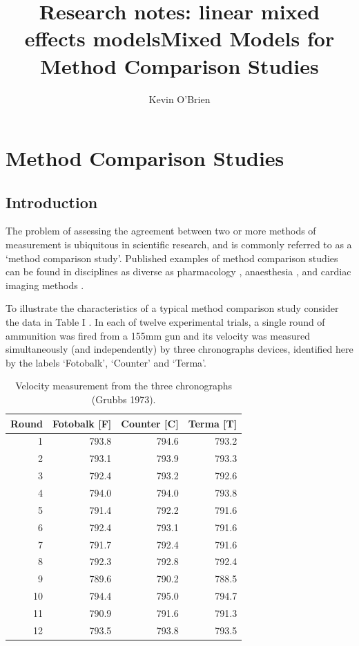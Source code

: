 \documentclass[12pt, a4paper]{report}
\title{Research notes: linear mixed effects models}
\author{ } \date{ }
\theoremstyle{plain}
\theoremstyle{definition}
\theoremstyle{remark}
\begin{document}
\author{Kevin O'Brien}
\title{Mixed Models for Method Comparison Studies}

\newpage
\chapter{Method Comparison Studies}

\section{Introduction}
The problem of assessing the agreement between two or more methods
of measurement is ubiquitous in scientific research, and is
commonly referred to as a `method comparison study'. Published
examples of method comparison studies can be found in disciplines
as diverse as pharmacology \citep{ludbrook97}, anaesthesia
\citep{Myles}, and cardiac imaging methods \citep{Krumm}.
\smallskip

To illustrate the characteristics of a typical method comparison
study consider the data in Table I \citep{Grubbs73}. In each of
twelve experimental trials, a single round of ammunition was fired
from a 155mm gun and its velocity was measured simultaneously (and
independently) by three chronographs devices, identified here by
the labels `Fotobalk', `Counter' and `Terma'.
\smallskip


\newpage

\begin{table}[ht]
\begin{center}
\begin{tabular}{rrrr}
  \hline
  Round& Fotobalk [F] & Counter [C]& Terma [T]\\
  \hline
  1 & 793.8 & 794.6 & 793.2 \\
  2 & 793.1 & 793.9 & 793.3 \\
  3 & 792.4 & 793.2 & 792.6 \\
  4 & 794.0 & 794.0 & 793.8 \\
  5 & 791.4 & 792.2 & 791.6 \\
  6 & 792.4 & 793.1 & 791.6 \\
  7 & 791.7 & 792.4 & 791.6 \\
  8 & 792.3 & 792.8 & 792.4 \\
  9 & 789.6 & 790.2 & 788.5 \\
  10 & 794.4 & 795.0 & 794.7 \\
  11 & 790.9 & 791.6 & 791.3 \\
  12 & 793.5 & 793.8 & 793.5 \\
   \hline
\end{tabular}
\caption{Velocity measurement from the three chronographs (Grubbs
1973).}
\end{center}
\end{table}
\end{document}

